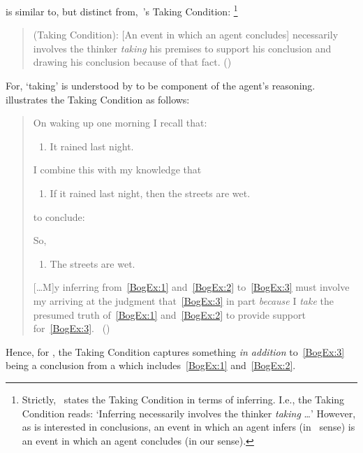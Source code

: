 \begin{note}
  \supportI{} is similar to, but distinct from,~\citeauthor{Boghossian:2014aa}'s Taking Condition:%
  \footnote{
    Strictly,~\citeauthor{Boghossian:2014aa} states the Taking Condition in terms of inferring.
    I.e., the Taking Condition reads: `Inferring necessarily involves the thinker \emph{taking} \dots'
    However, as \citeauthor{Boghossian:2008vf} is interested in conclusions, an event in which an agent infers (in~\citeauthor{Boghossian:2014aa} sense) is an event in which an agent concludes (in our sense).
  }

  \begin{quote}
    (Taking Condition):
    [An event in which an agent concludes] necessarily involves the thinker \emph{taking} his premises to support his conclusion and drawing his conclusion because of that fact.%
    \mbox{}\hfill\mbox{(\citeyear[5]{Boghossian:2014aa})}
  \end{quote}

  \noindent%
  For, `taking' is understood by \citeauthor{Boghossian:2014aa} to be component of the agent's reasoning.
  \citeauthor{Boghossian:2014aa} illustrates the Taking Condition as follows:
  \begin{quote}
    On waking up one morning I recall that:

    \begin{enumerate}[label=(\arabic*), ref=(\arabic*), series=BogEx]
    \item
      \label{BogEx:1}
      It rained last night.
    \end{enumerate}

    I combine this with my knowledge that

    \begin{enumerate}[label=(\arabic*), ref=(\arabic*), resume*=BogEx]
    \item
      \label{BogEx:2}
      If it rained last night, then the streets are wet.
    \end{enumerate}

    to conclude:

    So,

    \begin{enumerate}[label=(\arabic*), ref=(\arabic*), resume*=BogEx]
    \item
      \label{BogEx:3}
      The streets are wet.
    \end{enumerate}

    [\dots M]y inferring from~\ref{BogEx:1} and~\ref{BogEx:2} to~\ref{BogEx:3} must involve my arriving at the judgment that~\ref{BogEx:3} in part \emph{because} I \emph{take} the presumed truth of~\ref{BogEx:1} and~\ref{BogEx:2} to provide support for~\ref{BogEx:3}.%
    \mbox{ }\hfill\mbox{(\citeyear[2,4]{Boghossian:2014aa})}
  \end{quote}
  Hence, for \citeauthor{Boghossian:2014aa}, the Taking Condition captures something \emph{in addition} to~\ref{BogEx:3} being a conclusion from a \pool{} which includes~\ref{BogEx:1} and~\ref{BogEx:2}.


\end{note}
